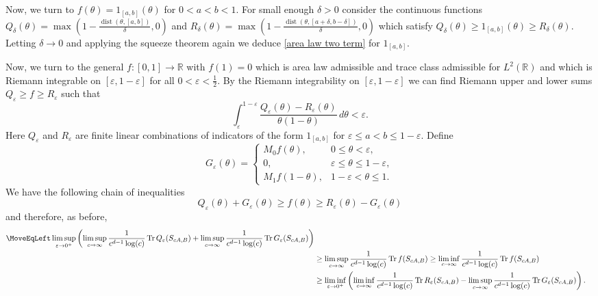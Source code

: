 \documentclass[12pt]{amsart}
\numberwithin{equation}{section}
\newcommand{\R}{\mathbb{R}}
\newcommand{\eps}{\varepsilon}
\begin{document}
Now, we turn to $f(\theta) = 1_{[a,b]}(\theta)$ for $0 < a < b < 1$. For small enough $\delta > 0$ consider the continuous functions $Q_\delta(\theta) = \max \left( 1-\frac{\operatorname{dist}(\theta, [a,b])}{\delta}, 0 \right)$ and $R_\delta(\theta) = \max \left( 1-\frac{\operatorname{dist}(\theta, [a+\delta,b-\delta])}{\delta}, 0 \right)$ which satisfy $Q_\delta(\theta) \geq 1_{[a,b]}(\theta) \geq R_\delta(\theta)$. Letting $\delta \to 0$ and applying the squeeze theorem again we deduce \eqref{area law two term} for $1_{[a,b]}$.

Now, we turn to the general $f:[0,1]\to \R$ with $f(1) = 0$ which is area law admissible and trace class admissible for $L^2(\R)$ and which is Riemann integrable on $[\eps, 1-\eps]$ for all $0 < \eps < \frac{1}{2}$. By the Riemann integrability on $[\eps,1-\eps]$ we can find Riemann upper and lower sums $Q_\eps \geq f \geq R_\eps$ such that
\begin{equation}\label{RQ difference}
\int_{\eps}^{1-\eps} \frac{Q_\eps(\theta) - R_\eps(\theta)}{\theta(1-\theta)} \, d\theta < \eps.
\end{equation}
Here $Q_\eps$ and $R_\eps$ are finite linear combinations of indicators of the form $1_{[a,b]}$ for $\eps \leq a <b \leq 1-\eps$. Define 
\[
G_{\eps}(\theta) = \begin{cases}
M_0f(\theta), & 0\le\theta<\eps,\\
0, & \eps \leq \theta \leq 1-\eps,\\
M_1 f(1-\theta), & 1-\eps < \theta \leq 1.
\end{cases}
\]
 We have the following chain of inequalities
\[
Q_{\eps}(\theta) + G_\eps(\theta) \geq f(\theta) \geq R_{\eps}(\theta) -G_\eps(\theta)
\]
and therefore, as before,  
\begin{equation*}
\begin{aligned}
\MoveEqLeft \limsup_{\eps\to 0^+} \left(\limsup_{c\to \infty}\frac{1}{c^{d-1}\log(c)}\operatorname{Tr}Q_{\eps}(S_{cA,B}) + \limsup_{c\to\infty}\frac{1}{c^{d-1}\log(c)}\operatorname{Tr} G_\eps(S_{cA,B})\right)\\
&\geq \limsup_{c\to \infty} \frac{1}{c^{d-1}\log(c)} \operatorname{Tr}f(S_{cA,B}) \geq \liminf_{c\to \infty} \frac{1}{c^{d-1}\log(c)} \operatorname{Tr} f(S_{cA,B})\\
&\geq \liminf_{\eps\to 0^+} \left(\liminf_{c\to \infty}\frac{1}{c^{d-1}\log(c)}\operatorname{Tr}R_{\eps}(S_{cA,B}) - \limsup_{c\to\infty}\frac{1}{c^{d-1}\log(c)}\operatorname{Tr} G_\eps(S_{cA,B})\right).
\end{aligned}
\end{equation*}
\end{document}
